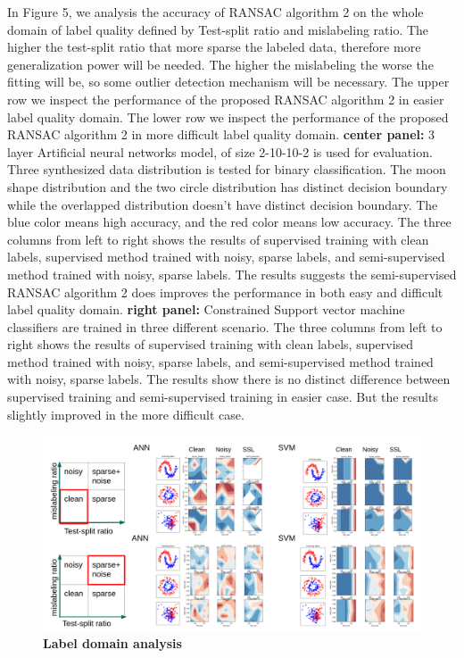 \documentclass[a4paper, times, 12pt, ,onecolumn,oneside,top=1.0cm,bottom=1.0cm,left=1.0 cm,right=1cm]{article}
\begin{document}
In Figure 5, we analysis the accuracy of RANSAC algorithm 2 on the whole domain of label quality defined by Test-split ratio and mislabeling ratio. The higher the test-split ratio that more sparse the labeled data, therefore more generalization power will be needed. The higher the mislabeling the worse the fitting will be, so some outlier detection mechanism will be necessary. The upper row we inspect the performance of the proposed RANSAC algorithm 2 in easier label quality domain. The lower row we inspect the performance of the proposed RANSAC algorithm 2 in more difficult label quality domain. \textbf{center panel: } 3 layer Artificial neural networks model, of size 2-10-10-2 is used for evaluation. Three synthesized data distribution is tested for binary classification. The moon shape distribution and the two circle distribution has distinct decision boundary while the overlapped distribution doesn't have distinct decision boundary. The blue color means high accuracy, and the red color means low accuracy. The three columns from left to right shows the results of supervised training with clean labels, supervised method trained with noisy, sparse labels, and semi-supervised method trained with noisy, sparse labels. The results suggests the semi-supervised RANSAC algorithm 2 does improves the performance in both easy and difficult label quality domain. \textbf{right panel: } Constrained Support vector machine classifiers are trained in three different scenario. The three columns from left to right shows the results of supervised training with clean labels, supervised method trained with noisy, sparse labels, and semi-supervised method trained with noisy, sparse labels. The results show there is no distinct difference between supervised training and semi-supervised training in easier case. But the results slightly improved in the more difficult case. 
\begin{figure}[ht]
\centering
  \includegraphics[scale = 0.2]{imgs/exp1_2-new.png}
  \caption{ \textbf{Label domain analysis} }
\end{figure}
\end{document}

